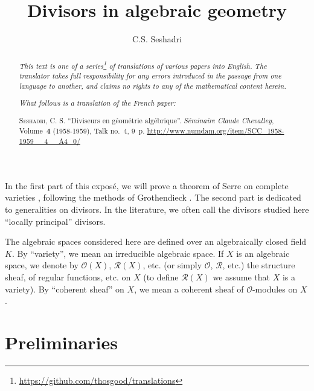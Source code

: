 \documentclass{article}
\title{Divisors in algebraic geometry}
\author{C.S. Seshadri}
\date{}
\theoremstyle{plain}
\theoremstyle{definition}
\newcommand{\sh}{\mathscr}
\newcommand{\oldpage}[1]{\marginpar{\footnotesize$\Big\vert$ \textit{p.~#1}}}
\begin{document}
\maketitle
\thispagestyle{fancy}

\renewcommand{\abstractname}{Translator's note.}

\begin{abstract}
  \renewcommand*{\thefootnote}{\fnsymbol{footnote}}
  \emph{This text is one of a series\footnote{\url{https://github.com/thosgood/translations}} of translations of various papers into English.}
  \emph{The translator takes full responsibility for any errors introduced in the passage from one language to another, and claims no rights to any of the mathematical content herein.}
  
  \emph{What follows is a translation of the French paper:}

  \medskip\noindent
  \textsc{Seshadri, C. S.}
  ``Diviseurs en g\'{e}om\'{e}trie alg\'{e}brique''.
  \emph{S\'{e}minaire Claude Chevalley}, Volume~\textbf{4} (1958-1959), Talk no.~4, 9~p.
  {\footnotesize\url{http://www.numdam.org/item/SCC_1958-1959__4__A4_0/}}
\end{abstract}

\setcounter{footnote}{0}

\tableofcontents
\bigskip



\oldpage{4-01}
In the first part of this expos\'{e}, we will prove a theorem of Serre on complete varieties \cite{6}, following the methods of Grothendieck \cite{4}.
The second part is dedicated to generalities on divisors.
In the literature, we often call the divisors studied here ``locally principal'' divisors.

The algebraic spaces considered here are defined over an algebraically closed field $K$.
By ``variety'', we mean an irreducible algebraic space.
If $X$ is an algebraic space, we denote by $\sh{O}(X)$, $\sh{R}(X)$, etc. (or simply $\sh{O}$, $\sh{R}$, etc.) the structure sheaf, of regular functions, etc. on $X$ (to define $\sh{R}(X)$ we assume that $X$ is a variety).
By ``coherent sheaf'' on $X$, we mean a coherent sheaf of $\sh{O}$-modules on $X$.


\section{Preliminaries}
\label{section1}

\cite{4,5,6}
\medskip
\end{document}
